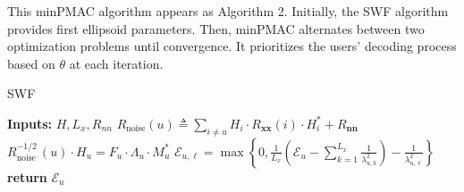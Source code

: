 

This minPMAC algorithm appears as Algorithm 2.  Initially, the SWF algorithm provides first ellipsoid parameters. Then, minPMAC alternates between two optimization problems until convergence. It prioritizes the users' decoding process based on $\theta$ at each iteration.

        



\begin{algorithm}[t]
	\caption{SWF} 
    \State \textbf{Inputs:} $H, L_x, R_{nn}$
            \State $R_{\text {noise}}(u) \triangleq \sum_{i \neq u} H_i \cdot R_{\boldsymbol{x} \boldsymbol{x}}(i) \cdot H_i^*+R_{\boldsymbol{nn}}$
            \vspace{0.1cm}\State $R_{\text {noise }}^{-1 / 2}(u) \cdot H_u=F_u \cdot \Lambda_u \cdot M_u^*$
            \vspace{0.1cm}
                \State $\mathcal{E}_{u,\ell} = \operatorname{max} \left\{0, {\frac{1}{L_x}}\left(\mathcal{E}_u - \sum_{k=1}^{L_x}\frac{1}{\lambda_{u,k}^2}\right) - \frac{1}{\lambda_{u,\ell}^2}\right\}$
            \vspace{0.1cm}
            \EndFor
		\EndFor
\State \textbf{return} $\mathcal{E}_u$
\end{algorithm}







